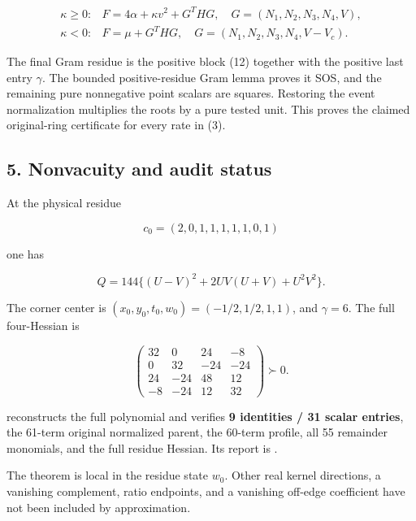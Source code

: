 \[
\begin{array}{ll}
\kappa\ge0:&F=4\alpha+\kappa v^2+G^THG,
\quad G=(N_1,N_2,N_3,N_4,V),\\[2mm]
\kappa<0:&F=\mu+G^THG,
\quad G=(N_1,N_2,N_3,N_4,V-V_c).
\end{array}
\tag{13}
\]

The final Gram residue is the positive block (12) together with the
positive last entry \(\gamma\). The bounded positive-residue Gram lemma
proves it SOS, and the remaining pure nonnegative point scalars are
squares. Restoring the event normalization multiplies the roots by a
pure tested unit. This proves the claimed original-ring certificate for
every rate in (3).

\hypertarget{nonvacuity-and-audit-status}{%
\subsection{5. Nonvacuity and audit status}\label{p03b551f2a9a0:nonvacuity-and-audit-status}}

At the physical residue

\[
c_0=(2,0,1,1,1,1,1,0,1)
\]

one has

\[
Q=144\{(U-V)^2+2UV(U+V)+U^2V^2\}.
\]

The corner center is \((x_0,y_0,t_0,w_0)=(-1/2,1/2,1,1)\), and
\(\gamma=6\). The full four-Hessian is

\[
\begin{pmatrix}
32&0&24&-8\\0&32&-24&-24\\24&-24&48&12\\-8&-24&12&32
\end{pmatrix}\succ0.
\]

 reconstructs the full polynomial and
verifies \textbf{9 identities / 31 scalar entries}, the 61-term original
normalized parent, the 60-term profile, all 55 remainder monomials, and
the full residue Hessian. Its report is
.

The theorem is local in the residue state \(w_0\). Other real kernel
directions, a vanishing complement, ratio endpoints, and a vanishing
off-edge coefficient have not been included by approximation.
